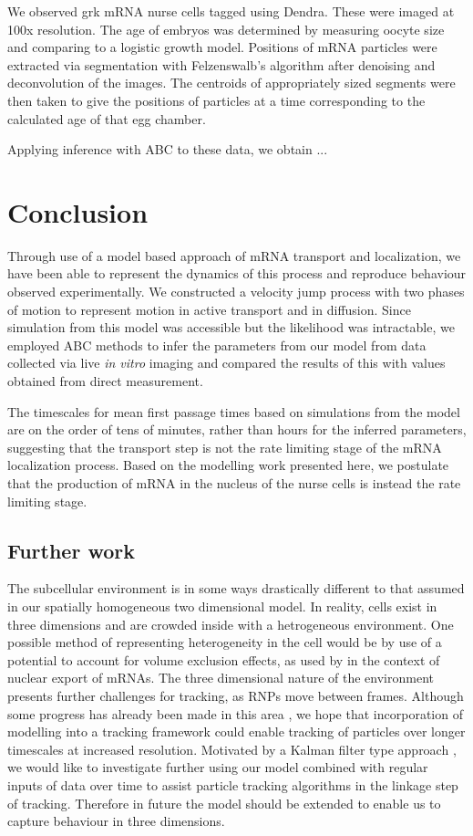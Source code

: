 \documentclass[twocolumn]{biophys}
\begin{document}
We observed grk mRNA nurse cells tagged using Dendra. These were imaged at 100x resolution.
The age of embryos was determined by measuring oocyte size and comparing to a logistic growth model.
Positions of mRNA particles were extracted via segmentation with Felzenswalb's algorithm \citep{felzenszwalb2004efficient} after denoising and deconvolution of the images.
The centroids of appropriately sized segments were then taken to give the positions of particles at a time corresponding to the calculated age of that egg chamber. 

Applying inference with ABC to these data, we obtain ... 

\section{Conclusion} \label{Conclusions}
Through use of a model based approach of mRNA transport and localization, we have been able to represent the dynamics of this process and reproduce behaviour observed experimentally.
We constructed a velocity jump process with two phases of motion to represent motion in active transport and in diffusion.
Since simulation from this model was accessible but the likelihood was intractable, we employed ABC methods to infer the parameters from our model from data collected via live \textit{in vitro} imaging and compared the results of this with values obtained from direct measurement.

The timescales for mean first passage times based on simulations from the model are on the order of tens of minutes, rather than hours for the inferred parameters, suggesting that the transport step is not the rate limiting stage of the mRNA localization process.
Based on the modelling work presented here, we postulate that the production of mRNA in the nucleus of the nurse cells is instead the rate limiting stage.

\subsection{Further work}
The subcellular environment is in some ways drastically different to that assumed in our spatially homogeneous two dimensional model.
In reality, cells exist in three dimensions and are crowded inside with a hetrogeneous environment. 
One possible method of representing heterogeneity in the cell would be by use of a potential to account for volume exclusion effects, as used by \citet{isaacson2011influence} in the context of nuclear export of mRNAs.
The three dimensional nature of the environment presents further challenges for tracking, as RNPs move between frames.
Although some progress has already been made in this area \citep{thompson2010three}, we hope that incorporation of modelling into a tracking framework could enable tracking of particles over longer timescales at increased resolution. 
Motivated by a Kalman filter type approach \citep{faragher2012understanding}, we would like to investigate further using our model combined with regular inputs of data over time to assist particle tracking algorithms in the linkage step of tracking.
Therefore in future the model should be extended to enable us to capture behaviour in three dimensions. 
\end{document}
